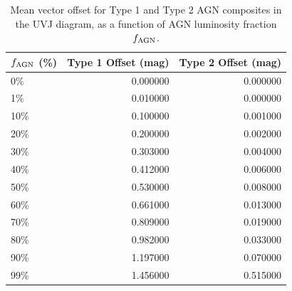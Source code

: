 \begin{table}
\caption{Mean vector offset for Type 1 and Type 2 AGN composites in the UVJ diagram, as a function of AGN luminosity fraction $f_{\rm AGN}$.}
\label{tab:UVJ_vectoroffset}
\begin{tabular}{lrr}
\toprule
$f_{\rm AGN}$ (\%) & Type 1 Offset (mag) & Type 2 Offset (mag) \\
\midrule
0\% & 0.000000 & 0.000000 \\
1\% & 0.010000 & 0.000000 \\
10\% & 0.100000 & 0.001000 \\
20\% & 0.200000 & 0.002000 \\
30\% & 0.303000 & 0.004000 \\
40\% & 0.412000 & 0.006000 \\
50\% & 0.530000 & 0.008000 \\
60\% & 0.661000 & 0.013000 \\
70\% & 0.809000 & 0.019000 \\
80\% & 0.982000 & 0.033000 \\
90\% & 1.197000 & 0.070000 \\
99\% & 1.456000 & 0.515000 \\
\bottomrule
\end{tabular}
\end{table}
